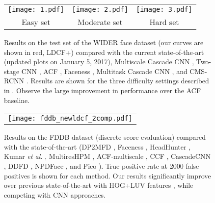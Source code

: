 \documentclass[a4paper,conference]{IEEEtran_icpr}
\begin{document}
\begin{figure*}[!t]
\centering
\begin{tabular}{ccc}
\texttt{[image: 1.pdf]} & \texttt{[image: 2.pdf]} & \texttt{[image: 3.pdf]}
\\
Easy set & Moderate set & Hard set
\end{tabular}
 \caption{Results on the test set of the WIDER face dataset \cite{wider} (our curves are shown in red, LDCF+) compared with the current state-of-the-art (updated plots on January 5, 2017), Multiscale Cascade CNN \cite{wider}, Two-stage CNN \cite{wider}, ACF \cite{acfmultiview,DollarPAMI14pyramids}, Faceness \cite{faceness}, Multitask Cascade CNN \cite{DBLP:journals/corr/ZhangZL016}, and CMS-RCNN \cite{DBLP:journals/corr/ZhuZLS16}. Results are shown for the three difficulty settings described in \cite{wider}. Observe the large improvement in performance over the ACF baseline. }
 \label{fig:widertest}
\end{figure*}

\begin{figure}[!t]
\centering
\begin{tabular}{c}

\texttt{[image: fddb\_newldcf\_2comp.pdf]}
\end{tabular}
 \caption{Results on the FDDB \cite{fddbTech} dataset (discrete score evaluation) compared with the state-of-the-art (DP2MFD \cite{DBLP:journals/corr/RanjanPC15}, Faceness \cite{faceness}, HeadHunter \cite{bellsand}, Kumar \textit{et al.} \cite{kumar15}, MultiresHPM \cite{DBLP:journals/corr/GhiasiF15}, ACF-multiscale \cite{acfmultiview}, CCF \cite{ccf}, CascadeCNN \cite{CascadeCNN}, DDFD \cite{ddfd}, NPDFace \cite{npdface}, and Pico \cite{DBLP:journals/corr/abs-1305-4537}). True positive rate at 2000 false positives is shown for each method. Our results significantly improve over previous state-of-the-art with HOG+LUV features \cite{bellsand}, while competing with CNN approaches.}
 \label{fig:fddb}
\end{figure}
\end{document}
